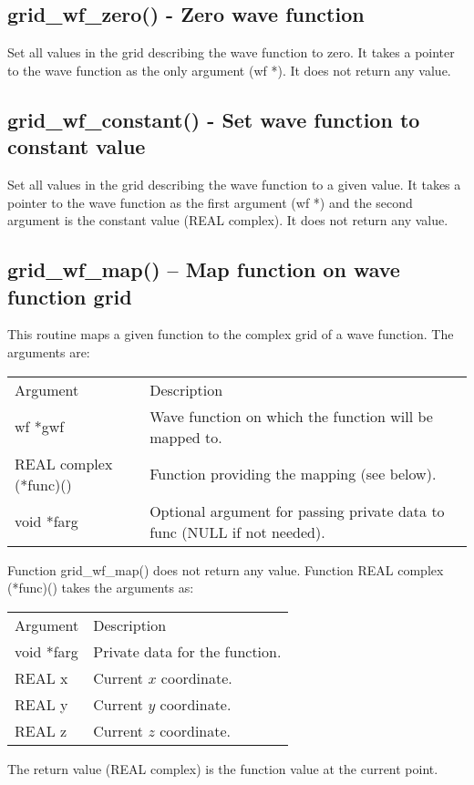 \documentclass[12pt,letterpaper]{report}
\begin{document}
\subsection{grid\_wf\_zero() - Zero wave function}

Set all values in the grid describing the wave function to zero. It takes a pointer to the wave function as the only argument (wf *). It does not return any value.

\subsection{grid\_wf\_constant() - Set wave function to constant value}

Set all values in the grid describing the wave function to a given value. It takes a pointer to the wave function as the first argument (wf *) and the second argument is the constant value (REAL complex). It does not return any value.

\subsection{grid\_wf\_map() -- Map function on wave function grid}

This routine maps a given function to the complex grid of a wave function. The arguments are:
\begin{longtable}{p{} p{}}
Argument & Description\\
\cline{1-2}
wf *gwf & Wave function on which the function will be mapped to.\\
REAL complex (*func)() & Function providing the mapping (see below).\\
void *farg & Optional argument for passing private data to func (NULL if not needed).\\
\end{longtable}
\noindent
Function grid\_wf\_map() does not return any value. Function REAL complex (*func)() takes the arguments as:
\begin{longtable}{p{} p{}}
Argument & Description\\
\cline{1-2}
void *farg & Private data for the function.\\
REAL x & Current $x$ coordinate.\\
REAL y & Current $y$ coordinate.\\
REAL z & Current $z$ coordinate.\\
\end{longtable} 
\noindent
The return value (REAL complex) is the function value at the current point.
\end{document}
